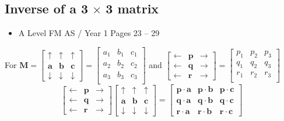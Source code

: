 \documentclass[11pt, a4paper]{article}
\begin{document}
\subsection{Inverse of a 3$\,\times\,$3 matrix}
\begin{itemize}
\item A Level FM AS / Year 1 \hspace{1cm} Pages 23 -- 29
\end{itemize} \par
For $\boldsymbol{M}=\begin{bmatrix} \uparrow & \uparrow & \uparrow \\ \boldsymbol{a} & \boldsymbol{b} & \boldsymbol{c} \\ \downarrow & \downarrow & \downarrow \end{bmatrix}=\begin{bmatrix}a_{1}&b_{1}&c_{1}\\a_{2}&b_{2}&c_{2}\\a_{3}&b_{3}&c_{3}\\ \end{bmatrix}$ and $\begin{bmatrix} \leftarrow & \boldsymbol{p} & \rightarrow \\ \leftarrow & \boldsymbol{q} & \rightarrow \\ \leftarrow & \boldsymbol{r} & \rightarrow \end{bmatrix}=\begin{bmatrix}p_{1}&p_{2}&p_{3}\\q_{1}&q_{2}&q_{3}\\r_{1}&r_{2}&r_{3}\\\end{bmatrix}$
\begin{equation*}
\begin{bmatrix} \leftarrow & \boldsymbol{p} & \rightarrow \\ \leftarrow & \boldsymbol{q} & \rightarrow \\ \leftarrow & \boldsymbol{r} & \rightarrow \end{bmatrix}\begin{bmatrix} \uparrow & \uparrow & \uparrow \\ \boldsymbol{a} & \boldsymbol{b} & \boldsymbol{c} \\ \downarrow & \downarrow & \downarrow \end{bmatrix}=\begin{bmatrix} \boldsymbol{p}\cdot\boldsymbol{a} & \boldsymbol{p}\cdot\boldsymbol{b} & \boldsymbol{p}\cdot\boldsymbol{c} \\ \boldsymbol{q}\cdot\boldsymbol{a} & \boldsymbol{q}\cdot\boldsymbol{b} & \boldsymbol{q}\cdot\boldsymbol{c} \\ \boldsymbol{r}\cdot\boldsymbol{a} & \boldsymbol{r}\cdot\boldsymbol{b} & \boldsymbol{r}\cdot\boldsymbol{c} \end{bmatrix}
\end{equation*}
\end{document}
